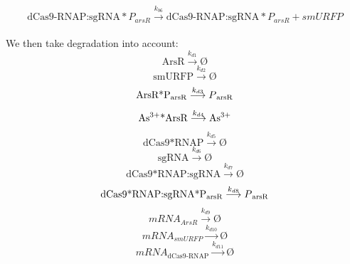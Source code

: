 \begin{equation}
	\text{dCas9-RNAP:sgRNA}*P_{arsR}\stackrel{k_{b6}}{\longrightarrow} \text{dCas9-RNAP:sgRNA}*P_{arsR}+smURFP
\end{equation}
\\
We then take degradation into account:\\
\begin{equation}
	\text{ArsR}\stackrel{k_{d1}}{\longrightarrow}Ø
\end{equation}
\begin{equation}
	\text{smURFP}\stackrel{k_{d2}}{\longrightarrow}Ø
\end{equation}
\begin{equation}
	\text{ArsR*P\textsubscript{arsR}}\stackrel{k_{d3}}{\longrightarrow} P\textsubscript{arsR}
\end{equation}
\begin{equation}
	\text{As\textsuperscript{3+}*ArsR} \stackrel{k_{d4}}{\longrightarrow}\text{As\textsuperscript{3+}}
\end{equation}
\begin{equation}
	\text{dCas9*RNAP}\stackrel{k_{d5}}{\longrightarrow}Ø
\end{equation}
\begin{equation}
	\text{sgRNA}\stackrel{k_{d6}}{\longrightarrow}Ø
\end{equation}
\begin{equation}
	\text{dCas9*RNAP:sgRNA}\stackrel{k_{d7}}{\longrightarrow}Ø
\end{equation}
\begin{equation}
	\text{dCas9*RNAP:sgRNA*P\textsubscript{arsR}}\stackrel{k_{d8}}{\longrightarrow}P\textsubscript{arsR}
\end{equation}
\begin{equation}
	mRNA_{ArsR}\stackrel{k_{d9}}{\longrightarrow}Ø
\end{equation}
\begin{equation}
	mRNA_{smURFP}\stackrel{k_{d10}}{\longrightarrow}Ø
\end{equation}
\begin{equation}
	mRNA_\text{dCas9-RNAP}\stackrel{k_{d11}}{\longrightarrow}Ø
\end{equation}
\\

